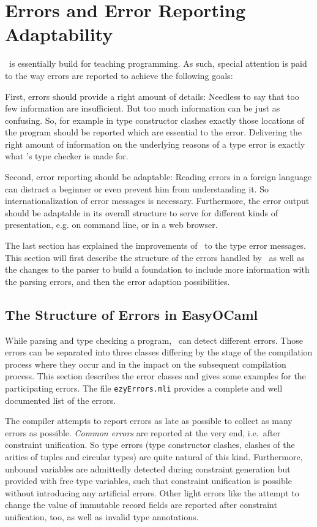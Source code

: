 
\section{Errors and Error Reporting Adaptability}
\label{sec:errors}

\easyocaml\ is essentially build for teaching programming.
As such, special attention is paid to the way errors are reported to achieve
the following goals:

First, errors should provide a right amount of details: Needless to say that too
few information are insufficient.
But too much information can be just as confusing.
So, for example in type constructor clashes exactly those locations
of the program should be reported which are essential to the error.
Delivering the right amount of information on the underlying reasons of a type
error is exactly what \easyocaml's type checker is made for.

Second, error reporting should be adaptable: Reading errors in a foreign
language can distract a beginner or even prevent him from understanding it.
So internationalization of error messages is necessary.
Furthermore, the error output should be adaptable in its overall structure to
serve for different kinds of presentation, e.g.  on command line, or in a web
browser.

The last section has explained the improvements of \easyocaml\ to the type
error messages. This section will first describe the structure  of the errors
handled by
\easyocaml\ as well as the changes to the parser to build a foundation to
include more information with the parsing errors, and then the error adaption
possibilities.

\subsection{The Structure of Errors in EasyOCaml}
\label{sec:easyerrors}

While parsing and type checking a program, \easyocaml\ can detect different errors.
Those errors can be separated into three classes differing by the stage of the
compilation process where they occur and in the impact on the subsequent
compilation process.
This section describes the error classes and gives some examples for the
participating errors.  The file \texttt{ezyErrors.mli} provides a complete and
well documented list of the errors.

The compiler attempts to report errors as late as possible to collect as many
errors as possible. \emph{Common errors} are reported at the very end, i.e.\
after constraint unification. So type errors (type constructor clashes, clashes
of the arities of tuples and circular types) are quite natural of this kind.
Furthermore, unbound variables are admittedly detected during constraint
generation but provided with free type variables, such that constraint
unification is possible without introducing any artificial errors.
Other light errors like the attempt to change the value of immutable record
fields are reported after constraint unification, too, as well as invalid type
annotations.


